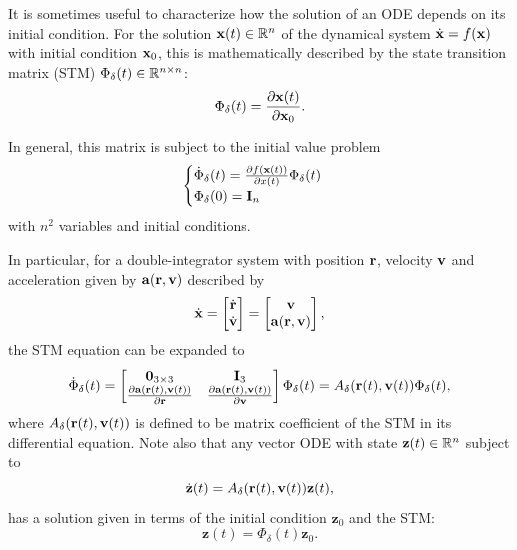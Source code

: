 It is sometimes useful to characterize how the solution of an ODE depends on its initial condition. For the solution \(\mathbf{x}(t) \in \mathbb{R}^n\) of the dynamical system \(\dot{\mathbf{x}} = f(\mathbf{x})\) with initial condition \(\mathbf{x}_0\), this is mathematically described by the state transition matrix (STM) \(\Phi_\delta(t) \in \mathbb{R}^{n \times n}\):
\begin{equation}\label{eq:stm_def}
    \Phi_\delta(t) = \frac{\partial \x(t)}{\partial \x_0}.
\end{equation}

In general, this matrix is subject to the initial value problem~\cite{montenbruck2000satellite}
\begin{equation}
    \begin{cases}
        \dot{\Phi}_\delta(t) = \frac{\partial f(\mathbf{x}(t))}{\partial x(t)} \Phi_\delta(t) \\
        \Phi_\delta(0) = \mathbf{I}_n
    \end{cases}
\end{equation}
with \(n^2\) variables and initial conditions.

In particular, for a double-integrator system with position \(\mathbf{r}\), velocity \(\mathbf{v}\) and acceleration given by \(\mathbf{a}(\mathbf{r}, \mathbf{v})\) described by
\begin{equation}
    \dot{\mathbf{x}} = \begin{bmatrix}
        \dot{\mathbf{r}} \\ \dot{\mathbf{v}}
    \end{bmatrix} = \begin{bmatrix}
        \mathbf{v} \\ \mathbf{a}(\mathbf{r}, \mathbf{v})
    \end{bmatrix},
\end{equation}
the STM equation can be expanded to %
\begin{equation}\label{eq:STM_r_v}
    \dot{\Phi}_\delta(t) = \begin{bmatrix}
        \mathbf{0}_{3\times 3} & \mathbf{I}_3 \\
        \frac{\partial \acc(\pos(t), \vel(t))}{\partial \pos} & \frac{\partial \acc(\pos(t), \vel(t))}{\partial \vel}
    \end{bmatrix} \Phi_\delta(t) = A_\delta(\pos(t), \vel(t)) \Phi_\delta(t),
\end{equation}
where \(A_\delta(\mathbf{r}(t), \mathbf{v}(t))\) is defined to be matrix coefficient of the STM in its differential equation. Note also that any vector ODE with state \(\mathbf{z}(t) \in \mathbb{R}^n\) subject to
\begin{equation}
    \dot{\mathbf{z}}(t) = A_\delta(\mathbf{r}(t), \mathbf{v}(t)) \mathbf{z}(t),
\end{equation}
has a solution given in terms of the initial condition \(\mathbf{z}_0\) and the STM:
\begin{equation}\label{eq:remark_STM}
    \mathbf{z}(t) = \Phi_\delta(t) \mathbf{z}_0.
\end{equation}

